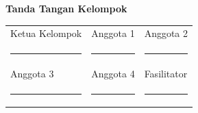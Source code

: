 \documentclass[12pt,a4paper]{report}
\begin{document}
\begin{center}
\begin{tcolorbox}[colback=plngreen!5, colframe=plngreen!70!black, width=0.88\textwidth, sharp corners, boxrule=1pt]
\centering
{\bfseries\color{plngreen!70!black}Tanda Tangan Kelompok}\\[0.5cm]
\begin{tabularx}{0.9\textwidth}{@{} X X X @{}}
\centering Ketua Kelompok & \centering Anggota 1 & \centering Anggota 2 \tabularnewline[1.3cm]
\centering\rule{3cm}{0.3pt} & \centering\rule{3cm}{0.3pt} & \centering\rule{3cm}{0.3pt} \tabularnewline[0.15cm]
\centering Anggota 3 & \centering Anggota 4 & \centering Fasilitator \tabularnewline[1.3cm]
\centering\rule{3cm}{0.3pt} & \centering\rule{3cm}{0.3pt} & \centering\rule{3cm}{0.3pt} \tabularnewline
\end{tabularx}
\end{tcolorbox}
\end{center}
\end{document}
